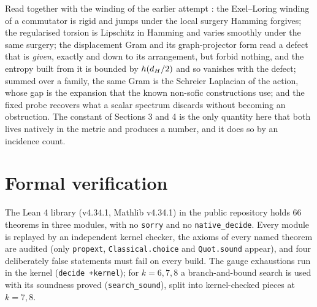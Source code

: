 \documentclass[11pt]{article}
\theoremstyle{remark}\newtheorem{remark}[theorem]{Remark}
\begin{document}
Read together with the winding of the earlier attempt \cite{trace}: the Exel--Loring winding of a commutator is rigid and jumps under the local surgery Hamming forgives; the regularised torsion is Lipschitz in Hamming and varies smoothly under the same surgery; the displacement Gram and its graph-projector form read a defect that is \emph{given}, exactly and down to its arrangement, but forbid nothing, and the entropy built from it is bounded by $h(d_H/2)$ and so vanishes with the defect; summed over a family, the same Gram is the Schreier Laplacian of the action, whose gap is the expansion that the known non-sofic constructions use; and the fixed probe recovers what a scalar spectrum discards without becoming an obstruction. The constant of Sections 3 and 4 is the only quantity here that both lives natively in the metric and produces a number, and it does so by an incidence count.

\section{Formal verification}\label{sec:lean}
The Lean 4 library (v4.34.1, Mathlib v4.34.1) in the public repository \cite{lean} holds 66 theorems in three modules, with no \texttt{sorry} and no \texttt{native\_decide}. Every module is replayed by an independent kernel checker, the axioms of every named theorem are audited (only \texttt{propext}, \texttt{Classical.choice} and \texttt{Quot.sound} appear), and four deliberately false statements must fail on every build. The gauge exhaustions run in the kernel (\texttt{decide +kernel}); for $k=6,7,8$ a branch-and-bound search is used with its soundness proved (\texttt{search\_sound}), split into kernel-checked pieces at $k=7,8$.
\end{document}
